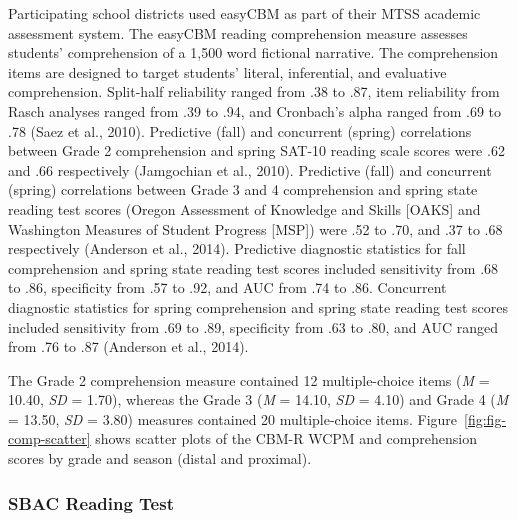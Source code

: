 \documentclass[
  english,
  man, fleqn, noextraspace]{apa6}
\begin{document}
Participating school districts used easyCBM as part of their MTSS academic assessment system. The easyCBM reading comprehension measure assesses students' comprehension of a 1,500 word fictional narrative. The comprehension items are designed to target students' literal, inferential, and evaluative comprehension. Split-half reliability ranged from .38 to .87, item reliability from Rasch analyses ranged from .39 to .94, and Cronbach's alpha ranged from .69 to .78 (Saez et al., 2010). Predictive (fall) and concurrent (spring) correlations between Grade 2 comprehension and spring SAT-10 reading scale scores were .62 and .66 respectively (Jamgochian et al., 2010). Predictive (fall) and concurrent (spring) correlations between Grade 3 and 4 comprehension and spring state reading test scores (Oregon Assessment of Knowledge and Skills {[}OAKS{]} and Washington Measures of Student Progress {[}MSP{]}) were .52 to .70, and .37 to .68 respectively (Anderson et al., 2014). Predictive diagnostic statistics for fall comprehension and spring state reading test scores included sensitivity from .68 to .86, specificity from .57 to .92, and AUC from .74 to .86. Concurrent diagnostic statistics for spring comprehension and spring state reading test scores included sensitivity from .69 to .89, specificity from .63 to .80, and AUC ranged from .76 to .87 (Anderson et al., 2014).

The Grade 2 comprehension measure contained 12 multiple-choice items (\emph{M} = 10.40, \emph{SD} = 1.70), whereas the Grade 3 (\emph{M} = 14.10, \emph{SD} = 4.10) and Grade 4 (\emph{M} = 13.50, \emph{SD} = 3.80) measures contained 20 multiple-choice items. Figure~\ref{fig:fig-comp-scatter} shows scatter plots of the CBM-R WCPM and comprehension scores by grade and season (distal and proximal).




\hypertarget{sbac-reading-test}{%
\subsubsection{SBAC Reading Test}\label{sbac-reading-test}}
\end{document}
